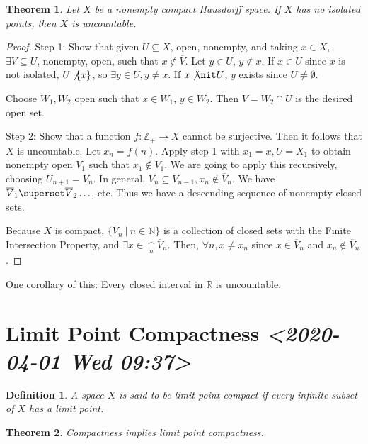 \documentclass[11pt]{article}
\newtheorem{theorem}{Theorem}[section]
\newtheorem{definition}{Definition}[section]
\begin{document}
\begin{theorem}
Let \(X\) be a nonempty compact Hausdorff space. If \(X\) has no isolated points,
then \(X\) is uncountable. 
\end{theorem}
\begin{proof}
Step 1: Show that given \(U\subseteq X\), open, nonempty, and taking \(x\in X\),
\(\exists V\subseteq U\), nonempty, open, such that \(x\not\in \overline{V}\). Let
\(y \in U\), \(y \not\in x\). If \(x \in U\) since \(x\) is not isolated, \(U \not
\{x\}\), so \(\exists y\in U, y\not = x\). If \(x \not\nit U\), \(y\) exists since
\(U\not = \emptyset\). 

Choose \(W_1, W_2\) open such that \(x\in W_1\), \(y\in W_2\). Then \(V = W_2\cap U\) is
the desired open set.  

Step 2: Show that a function \(f: \mathbb{Z}_+ \rightarrow X\) cannot be
surjective. Then it follows that \(X\) is uncountable. Let \(x_n = f(n)\). Apply
step 1 with \(x_1 = x, U = X_1\) to obtain nonempty open \(V_1\) such that \(x_1
\not\in \overline{V}_1\). We are going to apply this recursively, choosing
\(U_{n+1} = V_n\). In general, \(V_n \subseteq V_{n-1}, x_n \not\in
\overline{V}_n\). We have \(\overline{V}_1 \superset \overline{V}_2 \ldots\), etc.
Thus we have a descending sequence of nonempty closed sets.

Because \(X\) is compact, \(\{\overline{V}_n\ |\ n\in\mathbb{N}\}\) is a collection
of closed sets with the Finite Intersection Property, and \(\exists
x\in\cap\limits_n \overline{V}_n\). Then, \(\forall n, x\not = x_n\) since
\(x\in\overline{V}_n\) and \(x_n\not\in\overline{V}_n\).  
\end{proof}

One corollary of this: Every closed interval in \(\mathbb{R}\) is uncountable. 
\section{Limit Point Compactness \textit{<2020-04-01 Wed 09:37>}}
\label{sec:org463da95}
\begin{definition}
A space \(X\) is said to be limit point compact if every infinite subset of \(X\)
has a limit point. 
\end{definition}

\begin{theorem}
Compactness implies limit point compactness. 
\end{theorem}
\end{document}
